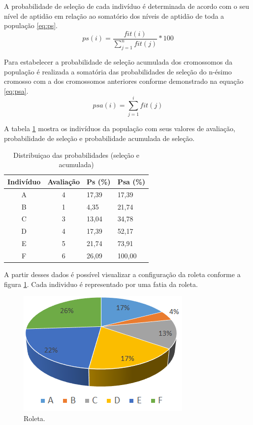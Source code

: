 \documentclass[twoside]{article}
\begin{document}
\begin{multicols}{2}
A probabilidade de seleção de cada indivíduo é determinada de acordo com o seu nível de aptidão em relação ao somatório dos níveis de aptidão de toda a população \ref{eq:ps}. 
\begin{equation}
\label{eq:ps}
ps(i) = \frac {fit(i)}{\sum\limits_{j=1}^n fit(j)} * 100
\end{equation}

Para estabelecer a probabilidade de seleção acumulada dos cromossomos da população é realizada a somatória das probabilidades de seleção do n-ésimo cromosso com a dos cromossomos anteriores conforme demonstrado na equação \ref{eq:psa}.
\begin{equation}
\label{eq:psa}
psa(i) = \sum\limits_{j=1}^i fit(j)
\end{equation}

A tabela \ref{tab:popinfo} mostra os indivíduos da população com seus valores de avaliação, probabilidade de seleção e probabilidade acumulada de seleção.
\begin{table}[H]
\label{tab:popinfo}
\caption{Distribuiçao das probabilidades (seleção e acumulada)}
\centering
\begin{tabular}{ccll}
\toprule
Indivíduo & Avaliação & Ps (\%) & Psa (\%) \\
\midrule
A & 4 & 17,39 & 17,39\\
B & 1 & 4,35 & 21,74\\
C & 3 & 13,04 & 34,78\\
D & 4 & 17,39 & 52,17\\
E & 5 & 21,74 & 73,91\\
F & 6 & 26,09 & 100,00\\
\bottomrule
\end{tabular}
\end{table}

A partir desses dados é possível visualizar a configuração da roleta conforme a figura \ref{fig:roleta}. Cada individuo é representado por uma fatia da roleta.

\begin{figure}[H]
\label{fig:roleta}
  \caption{Roleta.}
  \centering
    \includegraphics[scale = 0.8]{roleta.png}
\end{figure}


\end{multicols}
\end{document}
